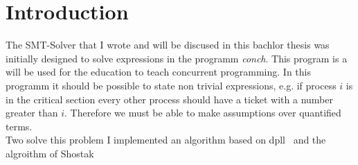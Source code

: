 \section{Introduction}

The SMT-Solver that I wrote and will be discused in this bachlor thesis was initially designed to solve expressions in the programm \emph{conch}. This program is a will be used for the education to teach concurrent programming. In this programm it should be possible to state non trivial expressions, e.g. if process $i$ is in the critical section every other process should have a ticket with a number greater than $i$. Therefore we must be able to make assumptions over quantified terms.\\
Two solve this problem I implemented an algorithm based on dpll~\cite{smt:dpllt:2004} and the algroithm of Shostak~\cite{smt:shostak:1984}
